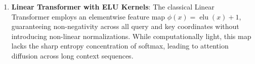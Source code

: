 \documentclass{article}
\begin{document}
\begin{enumerate}
\begin{equation}
    \end{equation}
    where $A_{m, m}^\dagger$ is approximated via iterative Schultz polynomial refinement: $Z_{k+1} = Z_k (2 I - A_{m, m} Z_k)$. This approximation preserves multi-scale semantic attention patterns while guaranteeing sub-quadratic execution.
    \item \textbf{Linear Transformer with ELU Kernels}:
    The classical Linear Transformer \citep{katharopoulos2020transformers} employs an elementwise feature map $\phi(x) = \operatorname{elu}(x) + 1$, guaranteeing non-negativity across all query and key coordinates without introducing non-linear normalizations. While computationally light, this map lacks the sharp entropy concentration of softmax, leading to attention diffusion across long context sequences.
\end{enumerate}
\end{document}
